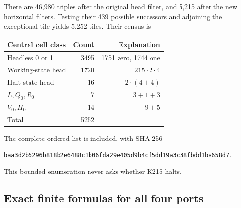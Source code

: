 There are 46,980 triples after the original head filter, and 5,215
after the new horizontal filters.  Testing their 439 possible successors
and adjoining the exceptional tile yields 5,252 tiles.  Their census is
\begin{center}\small
\begin{tabular}{lrr}
\toprule
Central cell class & Count & Explanation\\
\midrule
Headless 0 or 1 &3495&1751 zero, 1744 one\\
Working-state head &1720&$215\cdot2\cdot4$\\
Halt-state head &16&$2\cdot(4+4)$\\
$L,Q_0,R_0$ &7&$3+1+3$\\
$V_0,H_0$ &14&$9+5$\\
\midrule
Total &5252&\\
\bottomrule
\end{tabular}
\end{center}
The complete ordered list is included, with SHA-256
\begin{center}\scriptsize
\texttt{baa3d2b5296b818b2e6488c1b06fda29e405d9b4cf5dd19a3c38fbdd1ba658d7}.
\end{center}
This bounded enumeration never asks whether K215 halts.

\subsection{Exact finite formulas for all four ports}

